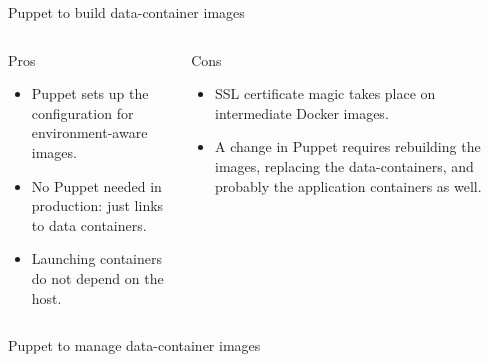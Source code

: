 \documentclass[presentation]{beamer}
\begin{document}
{
\begin{frame}[label=sec-9-5]{Puppet to build data-container images}

\begin{columns}
\begin{column}{0.5\textwidth}
\begin{block}{Pros}

\begin{itemize}
\item Puppet sets up the configuration for environment-aware images.
\item No Puppet needed in production: just links to data containers.
\item Launching containers do not depend on the host.
\end{itemize}
\end{block}
\end{column}

\begin{column}{0.5\textwidth}
\begin{block}{Cons}

\begin{itemize}
\item SSL certificate magic takes place on intermediate Docker images.
\item A change in Puppet requires rebuilding the images, replacing the data-containers, and probably the application containers as well.
\end{itemize}
\end{block}
\end{column}
\end{columns}
\end{frame}
} %

{
\begin{frame}[label=sec-9-6]{Puppet to manage data-container images}

\end{frame}
} %
\end{document}
